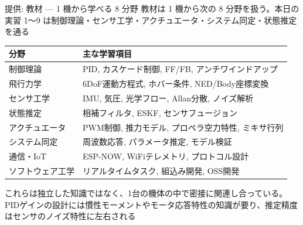 \begin{frame}{提供: 教材 --- 1 機から学べる 8 分野}
  {\small 教材は 1 機から次の 8 分野を扱う。本日の実習 1〜9 は制御理論・センサ工学・アクチュエータ・システム同定・状態推定を通る}

  \vspace{0.15em}

  \begin{table}
    \centering\footnotesize
    \renewcommand{\arraystretch}{1.0}
    \setlength{\tabcolsep}{10pt}
    \begin{tabular}{ll}
      \hline
      \textbf{分野} & \textbf{主な学習項目} \\
      \hline
      制御理論       & PID, カスケード制御, FF/FB, アンチワインドアップ \\
      飛行力学       & 6DoF運動方程式, ホバー条件, NED/Body座標変換 \\
      センサ工学     & IMU, 気圧, 光学フロー, Allan分散, ノイズ解析 \\
      状態推定       & 相補フィルタ, ESKF, センサフュージョン \\
      アクチュエータ & PWM制御, 推力モデル, プロペラ空力特性, ミキサ行列 \\
      システム同定   & 周波数応答, パラメータ推定, モデル検証 \\
      通信・IoT      & ESP-NOW, WiFiテレメトリ, プロトコル設計 \\
      ソフトウェア工学 & リアルタイムタスク, 組込み開発, OSS開発 \\
      \hline
    \end{tabular}
  \end{table}

  \vspace{0.15em}

  {\small これらは独立した知識ではなく、1台の機体の中で密接に関連し合っている。PIDゲインの設計には慣性モーメントやモータ応答特性の知識が要り、推定精度はセンサのノイズ特性に左右される}
\end{frame}

